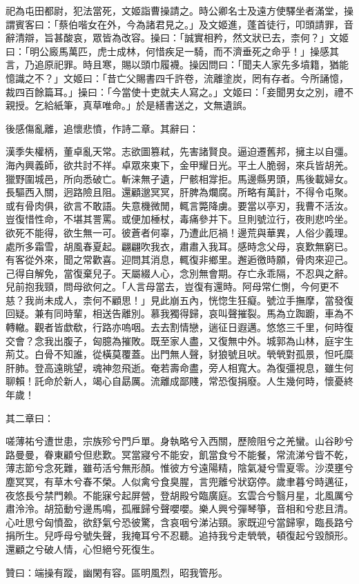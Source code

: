 \begin{pinyinscope}
祀為屯田都尉，犯法當死，文姬詣曹操請之。時公卿名士及遠方使驛坐者滿堂，操謂賓客曰：「蔡伯喈女在外，今為諸君見之。」及文姬進，蓬首徒行，叩頭請罪，音辭清辯，旨甚酸哀，眾皆為改容。操曰：「誠實相矜，然文狀已去，柰何？」文姬曰：「明公廄馬萬匹，虎士成林，何惜疾足一騎，而不濟垂死之命乎！」操感其言，乃追原祀罪。時且寒，賜以頭巾履襪。操因問曰：「聞夫人家先多墳籍，猶能憶識之不？」文姬曰：「昔亡父賜書四千許卷，流離塗炭，罔有存者。今所誦憶，裁四百餘篇耳。」操曰：「今當使十吏就夫人寫之。」文姬曰：「妾聞男女之別，禮不親授。乞給紙筆，真草唯命。」於是繕書送之，文無遺誤。

後感傷亂離，追懷悲憤，作詩二章。其辭曰：

漢季失權柄，董卓亂天常。志欲圖篡弒，先害諸賢良。逼迫遷舊邦，擁主以自彊。海內興義師，欲共討不祥。卓眾來東下，金甲耀日光。平土人脆弱，來兵皆胡羌。獵野圍城邑，所向悉破亡。斬涞無孑遺，尸骸相牚拒。馬邊縣男頭，馬後載婦女。長驅西入關，迥路險且阻。還顧邈冥冥，肝脾為爛腐。所略有萬計，不得令屯聚。或有骨肉俱，欲言不敢語。失意機微閒，輒言斃降虜。要當以亭刃，我曹不活汝。豈復惜性命，不堪其詈罵。或便加棰杖，毒痛參并下。旦則號泣行，夜則悲吟坐。欲死不能得，欲生無一可。彼蒼者何辜，乃遭此厄禍！邊荒與華異，人俗少義理。處所多霜雪，胡風春夏起。翩翩吹我衣，肅肅入我耳。感時念父母，哀歎無窮已。有客從外來，聞之常歡喜。迎問其消息，輒復非鄉里。邂逅徼時願，骨肉來迎己。己得自解免，當復棄兒子。天屬綴人心，念別無會期。存亡永乖隔，不忍與之辭。兒前抱我頸，問母欲何之。「人言母當去，豈復有還時。阿母常仁惻，今何更不慈？我尚未成人，柰何不顧思！」見此崩五內，恍惚生狂癡。號泣手撫摩，當發復回疑。兼有同時輩，相送告離別。慕我獨得歸，哀叫聲摧裂。馬為立踟躕，車為不轉轍。觀者皆歔欷，行路亦嗚咽。去去割情戀，遄征日遐邁。悠悠三千里，何時復交會？念我出腹子，匈臆為摧敗。既至家人盡，又復無中外。城郭為山林，庭宇生荊艾。白骨不知誰，從橫莫覆蓋。出門無人聲，豺狼號且吠。煢煢對孤景，怛吒糜肝肺。登高遠眺望，魂神忽飛逝。奄若壽命盡，旁人相寬大。為復彊視息，雖生何聊賴！託命於新人，竭心自勗厲。流離成鄙賤，常恐復捐廢。人生幾何時，懷憂終年歲！

其二章曰：

嗟薄祐兮遭世患，宗族殄兮門戶單。身執略兮入西關，歷險阻兮之羌蠻。山谷眇兮路曼曼，眷東顧兮但悲歎。冥當寢兮不能安，飢當食兮不能餐，常流涕兮眥不乾，薄志節兮念死難，雖苟活兮無形顏。惟彼方兮遠陽精，陰氣凝兮雪夏零。沙漠壅兮塵冥冥，有草木兮春不榮。人似禽兮食臭腥，言兜離兮狀窈停。歲聿暮兮時邁征，夜悠長兮禁門赖。不能寐兮起屏營，登胡殿兮臨廣庭。玄雲合兮翳月星，北風厲兮肅泠泠。胡笳動兮邊馬鳴，孤雁歸兮聲嚶嚶。樂人興兮彈琴箏，音相和兮悲且清。心吐思兮匈憤盈，欲舒氣兮恐彼驚，含哀咽兮涕沾頸。家既迎兮當歸寧，臨長路兮捐所生。兒呼母兮號失聲，我掩耳兮不忍聽。追持我兮走煢煢，頓復起兮毀顏形。還顧之兮破人情，心怛絕兮死復生。

贊曰：端操有蹤，幽閑有容。區明風烈，昭我管彤。


\end{pinyinscope}